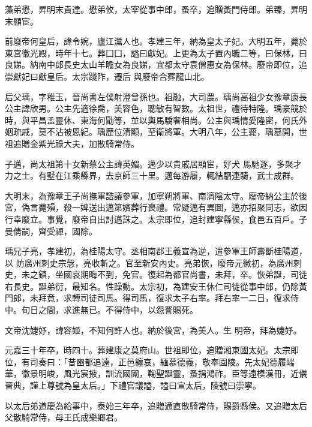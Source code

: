 \begin{pinyinscope}
 藻弟懋，昇明末貴達。懋弟攸，太宰從事中郎，蚤卒，追贈黃門侍郎。弟臻，昇明末顯宦。



 前廢帝何皇后，諱令婉，廬江灊人也。孝建三年，納為皇太子妃。大明五年，薨於東宮徽光殿，時年十七。葬囗囗，謚曰獻妃。上更為太子置內職二等，曰保林，曰良娣。納南中郎長史太山羊瞻女為良娣，宜都太守袁僧惠女為保林。廢帝即位，追崇獻妃曰獻皇后。太宗踐阼，遷后
 與廢帝合葬龍山北。



 后父瑀，字稚玉，晉尚書左僕射澄曾孫也。祖融，大司農。瑀尚高祖少女豫章康長公主諱欣男。公主先適徐喬，美容色，聰敏有智數。太祖世，禮待特隆。瑀豪競於時，與平昌孟靈休、東海何勖等，並以輿馬驕奢相尚。公主與瑀情愛隆密，何氏外姻疏戚，莫不沾被恩紀。瑀歷位清顯，至衛將軍。大明八年，公主薨，瑀墓開，世祖追贈金紫光祿大夫，加散騎常侍。



 子邁，尚太祖第十女新蔡公主諱英媚。邁少以貴戚居顯宦，好犬
 馬馳逐，多聚才力之士。有墅在江乘縣界，去京師三十里。邁每游履，輒結駟連騎，武士成群。



 大明末，為豫章王子尚撫軍諮議參軍，加寧朔將軍、南濟陰太守。廢帝納公主於後宮，偽言薨殞，殺一婢送出邁第嬪葬行喪禮。常疑邁有異圖，邁亦招聚同志，欲因行幸廢立。事覺，廢帝自出討邁誅之。太宗即位，追封建寧縣侯，食邑五百戶。子曼倩嗣，齊受禪，國除。



 瑀兄子亮，孝建初，為桂陽太守。丞相南郡王義宣為逆，遣參軍王師壽斷桂陽道，以
 防廣州刺史宗愨，亮收斬之。官至新安內史。亮弟恢，廢帝元徽初，為廣州刺史，未之鎮，坐國哀期晦不到，免官。復起為都官尚書，未拜，卒。恢弟誕，司徒右長史。誕弟衍，最知名。性躁動。太宗初，為建安王休仁司徒從事中郎，仍除黃門郎，未拜竟，求轉司徒司馬。得司馬，復求太子右率。拜右率一二日，復求侍中。旬日之間，求進無已。不得侍中，以怨詈賜死。



 文帝沈婕妤，諱容姬，不知何許人也。納於後宮，為美人。生
 明帝，拜為婕妤。



 元嘉三十年卒，時四十。葬建康之莫府山。世祖即位，追贈湘東國太妃。太宗即位，有司奏曰：「昔豳都追遠，正邑纏哀，緬慕德義，敬奉園陵。先太妃德履端華，徽景明峻，風光宸掖，訓流國闈，鞠聖誕靈，蚤捐鴻祚。臣等遠模漢冊，近儀晉典，謹上尊號為皇太后。」下禮官議謚，謚曰宣太后，陵號曰崇寧。



 以太后弟道慶為給事中，泰始三年卒，追贈通直散騎常侍，賜爵縣侯。又追贈太后父散騎常侍，母王氏成樂鄉君。




\end{pinyinscope}
